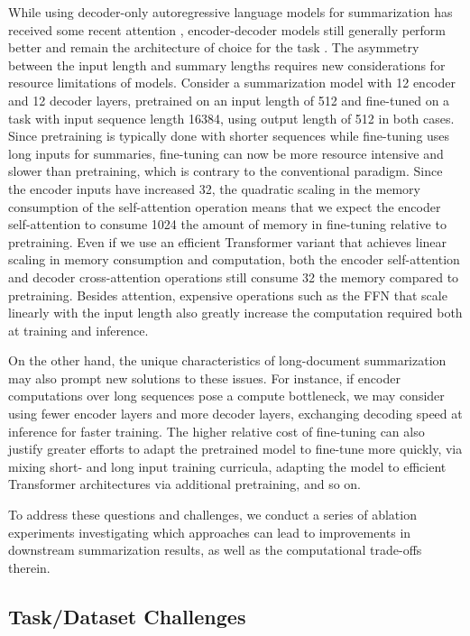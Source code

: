 \documentclass[11pt]{article}
\begin{document}
While using decoder-only autoregressive language models for summarization has received some recent attention \citep{radford2019gpt2,brown2020gpt3,chowdhery2022palm}, encoder-decoder models still generally perform better and remain the architecture of choice for the task \citep{wang2022language}.
The asymmetry between the input length and summary lengths requires new considerations for resource limitations of models.
Consider a summarization model with 12 encoder and 12 decoder layers, pretrained on an input length of 512 and fine-tuned on a task with input sequence length 16384, using output length of 512 in both cases.
Since pretraining is typically done with shorter sequences while fine-tuning uses long inputs for summaries, fine-tuning can now be more resource intensive and slower than pretraining, which is contrary to the conventional paradigm.
Since the encoder inputs have increased 32, the quadratic scaling in the memory consumption of the self-attention operation means that we expect the encoder self-attention to consume 1024 the amount of memory in fine-tuning relative to pretraining.
Even if we use an efficient Transformer variant that achieves linear scaling in memory consumption and computation, both the encoder self-attention and decoder cross-attention operations still consume 32 the memory compared to pretraining.
Besides attention, expensive operations such as the FFN that scale linearly with the input length also greatly increase the computation required both at training and inference.

On the other hand, the unique characteristics of long-document summarization may also prompt new solutions to these issues.
For instance, if encoder computations over long sequences pose a compute bottleneck, we may consider using fewer encoder layers and more decoder layers, exchanging decoding speed at inference for faster training.
The higher relative cost of fine-tuning can also justify greater efforts to adapt the pretrained model to fine-tune more quickly, via mixing short- and long input training curricula, adapting the model to efficient Transformer architectures via additional pretraining, and so on.

To address these questions and challenges, we conduct a series of ablation experiments investigating which approaches can lead to improvements in downstream summarization results, as well as the computational trade-offs therein.

\subsection{Task/Dataset Challenges}
\end{document}
